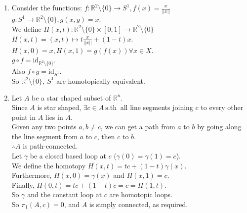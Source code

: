 \documentclass{article}
\newcommand{\sth}{\mathrm{s.th}\ }
\newcommand{\R}{\mathbb{R}}
\theoremstyle{remark}
\begin{document}
\begin{enumerate}
      \item Consider the functions:
            $f: \mathbb{R}^{2} \setminus \{0\} \to S^1, f(x) = \frac{x}{||x||}$\\
            $g: S^1 \to \R^2 \setminus \{0\}, g(x,y) = x$.\\
            We define $H(x,t):\R^2 \setminus \{0\} \times [0,1] \to \R^2 \setminus \{0\}$\\
            $H(x,t) = (x,t) \mapsto t \frac{x}{||x||} + (1-t)x$.\\
            $H(x,0)=x, H(x,1)=g(f(x)) \forall x \in X$.\\
            $g \circ f = \mathrm{id}_{\R^2\setminus\{0\}}$.\\
            Also $f \circ g = \mathrm{id}_{S^1}$.\\
            So $\mathbb{R}^{2} \setminus \{0\},\ S^1$ are homotopically equivalent.
      \item Let $A$ be a star shaped subset of $\R^n$.\\
            Since $A$ is star shaped, $\exists c \in A\ \sth$ all line segments
            joining $c$ to every other point in $A$ lies in $A$.\\
            Given any two points $a,b \neq c$, we can get a path from $a$ to $b$
            by going along the line segment from $a$ to $c$, then $c$ to $b$.\\
            $\therefore A$ is path-connected.\\
            Let $\gamma$ be a closed based loop at $c$ ($\gamma(0)=\gamma(1)=c$).\\
            We define the homotopy $H(x,t)=tc+(1-t)\gamma(x)$.\\
            Furthermore, $H(x,0)=\gamma(x)$ and $H(x,1)=c$.\\
            Finally, $H(0,t)=tc+(1-t)c=c=H(1,t)$.\\
            So $\gamma$ and the constant loop at $c$ are homotopic loops.\\
            So $\pi_1(A,c)=0$, and $A$ is simply connected, as required.



\end{enumerate}
\end{document}
